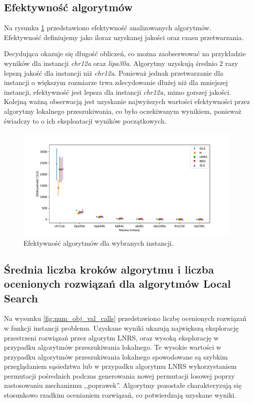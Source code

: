\documentclass{article}
\begin{document}
\subsection{Efektywność algorytmów}
Na rysunku \ref{fig:efficiency} przedstawiono efektywność analizowanych algorytmów. Efektywność definiujemy jako iloraz uzyskanej jakości oraz czasu przetwarzania. 
\par 
Decydująca okazuje się długość obliczeń, co można zaobserwować na przykładzie wyników dla instancji \textit{chr12a} oraz \textit{lipa30a}. Algorytmy uzyskują średnio 2 razy lepszą jakość dla instancji  niż \textit{chr12a}. Ponieważ jednak przetwarzanie dla instancji o większym rozmiarze trwa zdecydowanie dłużej niż dla mniejszej instancji, efektywność jest lepsza dla instancji \textit{chr12a}, mimo gorszej jakości. Kolejną ważną obserwacją jest uzyskanie najwyższych wartości efektywności przez algorytmy lokalnego przeszukiwania, co było oczekiwanym wynikiem, ponieważ świadczy to o ich eksploatacji wyników początkowych.
\begin{figure}[H]
	\centering
	\includegraphics[width=\linewidth]{figs/efficiency.pdf}
	\caption{Efektywność algorytmów dla wybranych instancji.}
	\label{fig:efficiency}
\end{figure}

\subsection{Średnia liczba kroków algorytmu i liczba ocenionych rozwiązań dla algorytmów Local Search}
Na wysunku \ref{fig:num_obj_val_calls} przedstawiono liczbę ocenionych rozwiązań w funkcji instancji problemu. Uzyskane wyniki ukazują największą eksplorację przestrzeni rozwiązań przez algorytm LNRS, oraz wysoką eksplorację w przypadku algorytmów przeszukiwania lokalnego. Te wysokie wartości w przypadku algorytmów przeszukiwania lokalnego spowodowane są szybkim przeglądaniem sąsiedztwa lub w przypadku algorytmu LNRS wykorzystaniem permutacji pośrednich podczas generowania nowej permutacji losowej poprzy zastosowaniu mechanizmu ,,poprawek''. Algorytmy pozostałe charakteryzują się stosunkowo rzadkim ocenianiem rozwiązań, co potwierdzają uzyskane wyniki.
\end{document}

